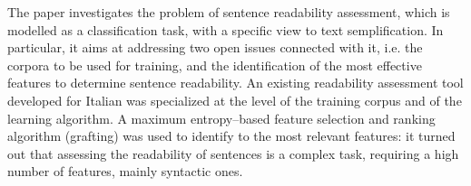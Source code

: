 The paper investigates the problem of sentence readability assessment, which is modelled as a classification task, with a specific view to text semplification. In particular, it aims at addressing two open issues connected with it, i.e. the corpora to be used for training, and the identification of the most effective features to determine sentence readability. An existing readability assessment tool developed for Italian was specialized at the level of the training corpus and of the learning algorithm. A maximum entropy--based feature selection and ranking algorithm (grafting) was used to identify to the most relevant features: it turned out that assessing the readability of sentences is a complex task, requiring a high number of features, mainly syntactic ones.
